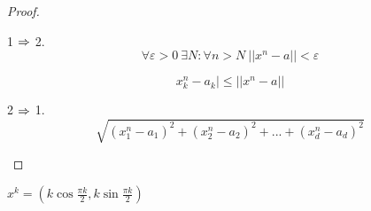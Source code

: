     \begin{proof}
        \begin{MyList}
            \item[] 1 $\Rightarrow$ 2.
            \[\forall \varepsilon > 0 \ \exists N : \forall n > N \ ||x^n - a|| < \varepsilon\]

            \[x_k^n - a_k| \leqslant ||x^n - a||\]

            \item[] 2 $\Rightarrow$ 1. 
            \[\sqrt{(x_1^n - a_1)^2 + (x_2^n - a_2)^2 + ... + (x_d^n - a_d)^2}\]
        \end{MyList}
    \end{proof}

    \begin{Rem}
        $x^k = \left(k \cos \frac{\pi k}{2}, k \sin \frac{\pi k}{2}\right)$ 
    \end{Rem}

    
